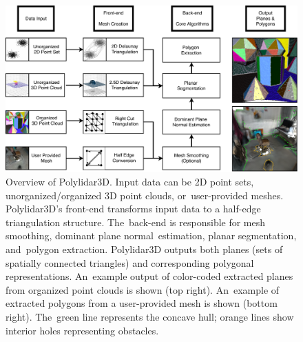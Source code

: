\begin{figure}[t]
    \centering
    \includegraphics[width=0.95\linewidth]{chapter_3_polylidar3d/imgs/Polylidar3DArchitecture-SimplifedV4.pdf}
    \caption[Overview of Polylidar3D's data input, algorithms, and output]{Overview of Polylidar3D. Input data can be 2D point sets, unorganized/organized 3D point clouds, or~user-provided meshes. Polylidar3D's front-end transforms input data to a half-edge triangulation structure. The~back-end is responsible for mesh smoothing, dominant plane normal~estimation, planar segmentation, and~polygon extraction. Polylidar3D outputs both planes (sets of spatially connected triangles) and corresponding polygonal representations. An~example output of color-coded extracted planes from organized point clouds is shown (top right). An~example of extracted polygons from a user-provided mesh is shown (bottom right). The~green line represents the concave hull; orange lines show interior holes representing obstacles.} %
    \label{fig:ch3_polylidar_overview}
\end{figure}


